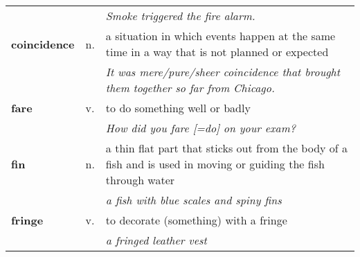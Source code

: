 \documentclass[a4paper]{article}
\begin{document}
\begin{longtable}{llp{11cm}}
 & & \textit{Smoke triggered the fire alarm.}\\[0.08cm]
\textbf{coincidence} & n. &  a situation in which events happen at the same time in a way that is not planned or expected \\
 & & \textit{It was mere/pure/sheer coincidence that brought them together so far from Chicago.}\\[0.08cm]
\textbf{fare} & v. &  to do something well or badly \\
 & & \textit{How did you fare [=do] on your exam?}\\[0.08cm]
\textbf{fin} & n. &  a thin flat part that sticks out from the body of a fish and is used in moving or guiding the fish through water \\
 & & \textit{a fish with blue scales and spiny fins}\\[0.08cm]
\textbf{fringe} & v. &  to decorate (something) with a fringe \\
 & & \textit{a fringed leather vest}\\[0.08cm]
\end{longtable}
\end{document}
